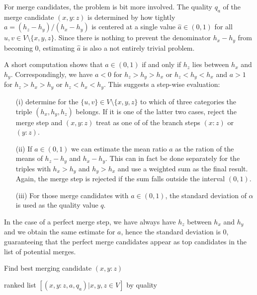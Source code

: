 \documentclass{article}
\begin{document}
For merge candidates, the problem is bit more involved. The quality $q_a$
of the merge candidate $(x,y:z)$ is determined by how tightly
$a=(h_z-h_y)/(h_x-h_y)$ is centered at a single value $\hat a\in (0,1)$ for
all $u,v\in V\setminus\{x,y,z\}$. Since there is nothing to prevent the
denominator $h_x-h_y$ from becoming $0$, estimating $\hat a$ is also a not
entirely trivial problem.

A short computation shows that $a\in(0,1)$ if and only if $h_z$ lies
between $h_x$ and $h_y$. Correspondingly, we have $a<0$ for $h_z>h_y>h_x$
or $h_z<h_y<h_x$ and $a>1$ for $h_z>h_x>h_y$ or $h_z<h_x<h_y$.  This
suggests a step-wise evaluation:
\begin{itemize} 
\item[(i)] determine for the $\{u,v\}\in V\setminus\{x,y,z\}$ to which of
  three categories the triple $(h_x,h_y,h_z)$ belongs. If it is one of the
  latter two cases, reject the merge step and $(x,y:z)$ treat as one of of
  the branch steps $(x:z)$ or $(y:z)$.
\item[(ii)] If $a\in(0,1)$ we can estimate the mean ratio $a$ as the ration
  of the means of $h_z-h_y$ and $h_x-h_y$. This can in fact be done
  separately for the triples with $h_x>h_y$ and $h_y>h_x$ and use a
  weighted sum as the final result. Again, the merge step is rejected if
  the sum falls outside the interval $(0,1)$. 
\item[(iii)] For those merge candidates with $a\in(0,1)$, the standard
  deviation of $\alpha$ is used as the quality value $q$.
\end{itemize}
In the case of a perfect merge step, we have always have $h_z$ between
$h_x$ and $h_y$ and we obtain the same estimate for $a$, hence the standard
deviation is $0$, guaranteeing that the perfect merge candidates appear as
top candidates in the list of potential merges.

\begin{algorithm}[H]
\caption{Find best merging candidate $(x,y:z)$ } 
\label{alg:mergestep}

\Return ranked list $[(x,y:z,a,q_a)| x,y,z\in V]$ by quality\;
\end{algorithm} 
\end{document}
